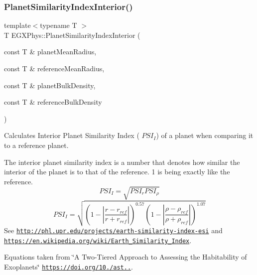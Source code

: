 \subsubsection{\texorpdfstring{Planet\+Similarity\+Index\+Interior()}{PlanetSimilarityIndexInterior()}}
{\footnotesize\ttfamily template$<$typename T $>$ \\
T E\+G\+X\+Phys\+::\+Planet\+Similarity\+Index\+Interior (\begin{DoxyParamCaption}\item[{const T \&}]{planet\+Mean\+Radius,  }\item[{const T \&}]{reference\+Mean\+Radius,  }\item[{const T \&}]{planet\+Bulk\+Density,  }\item[{const T \&}]{reference\+Bulk\+Density }\end{DoxyParamCaption})}



Calculates Interior Planet Similarity Index ( $PSI_I$) of a planet when comparing it to a reference planet. 

The interior planet similarity index is a number that denotes how similar the interior of the planet is to that of the reference. 1 is being exactly like the reference. \[PSI_I=\sqrt{PSI_r PSI_\rho}\] \[PSI_I=\sqrt{\left ( 1 - \left | \frac{r-r_{ref}}{r+r_{ref}} \right | \right )^{0.57} \left ( 1 - \left | \frac{\rho-\rho_{ref}}{\rho+\rho_{ref}} \right | \right )^{1.07}}\] See \href{http://phl.upr.edu/projects/earth-similarity-index-esi}{\tt http\+://phl.\+upr.\+edu/projects/earth-\/similarity-\/index-\/esi} and \href{https://en.wikipedia.org/wiki/Earth_Similarity_Index}{\tt https\+://en.\+wikipedia.\+org/wiki/\+Earth\+\_\+\+Similarity\+\_\+\+Index}.

Equations taken from \char`\"{}\+A Two-\/\+Tiered Approach to Assessing the Habitability of Exoplanets\char`\"{} \href{https://doi.org/10.1089/ast.2010.0592}{\tt https\+://doi.\+org/10./ast..}.


